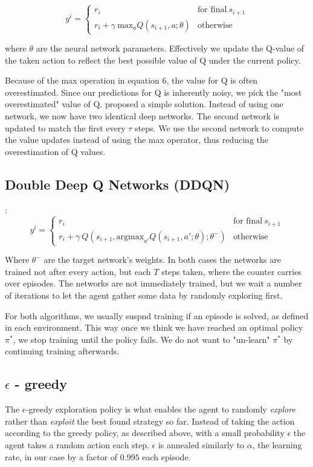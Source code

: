 \documentclass{article}
\begin{document}
\begin{equation}
    y^i =
    \begin{cases}
        r_i\quad & \text{for final}\ s_{i+1} \\
        r_i + \gamma\ \text{max}_a Q(s_{i+1}, a; \theta) & \text{otherwise}
    \end{cases}
\end{equation}

where $\theta$ are the neural network parameters. Effectively we update the Q-value of the taken action to reflect the best possible value of Q under the current policy. 
    
Because of the max operation in equation 6, the value for Q is often overestimated. Since our predictions for Q is inherently noisy, we pick the "most overestimated" value of Q. \textcite{DBLP:journals/corr/HasseltGS15} proposed a simple solution. Instead of using one network, we now have two identical deep networks. The second network is updated to match the first every $\tau$ steps. We use the second network to compute the value updates instead of using the max operator, thus reducing the overestimation of Q values.

\subsection{Double Deep Q Networks (DDQN)}:
\begin{equation}
    y^i =
    \begin{cases}
        r_i\quad & \text{for final}\ s_{i+1} \\
        r_i + \gamma\ Q(s_{i+1}, \text{argmax}_{a'} Q(s_{i+1}, a'; \theta); \theta^-) & \text{otherwise}
    \end{cases}
\end{equation}

Where $\theta^-$ are the target network's weights. In both cases the networks are trained not after every action, but each $T$ steps taken, where the counter carries over episodes. The networks are not immediately trained, but we wait a number of iterations to let the agent gather some data by randomly exploring first.

For both algorithms, we usually suspnd training if an episode is solved, as defined in each environment. This way once we think we have reached an optimal policy $\pi^*$, we stop training until the policy fails. We do not want to "un-learn" $\pi^*$ by continuing training afterwards.

\subsection{$\epsilon$ - greedy}
The $\epsilon$-greedy exploration policy is what enables the agent to randomly \textit{explore} rather than \textit{exploit} the best found strategy so far. Instead of taking the action according to the greedy policy, as described above, with a small probability $\epsilon$ the agent takes a random action each step. $\epsilon$ is annealed similarly to $\alpha$, the learning rate, in our case by a factor of $0.995$ each episode.
\end{document}
